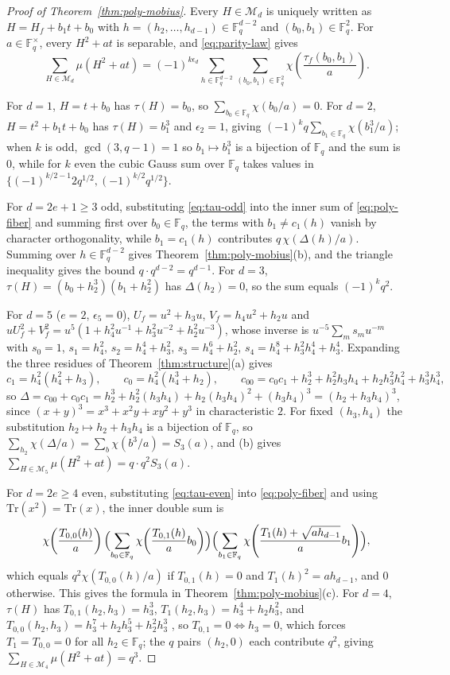 \documentclass[11pt,a4paper]{amsart}
\theoremstyle{remark}
\numberwithin{equation}{section}
\newcommand{\Fq}{\mathbb{F}_q}
\newcommand{\Tr}{\mathrm{Tr}}
\newcommand{\Me}{\mathcal{M}}
\begin{document}
\begin{proof}[Proof of Theorem~\ref{thm:poly-mobius}]
Every $H\in\Me_d$ is uniquely written as $H=H_f+b_1t+b_0$ with $h=(h_2,\dots,h_{d-1})\in\Fq^{d-2}$ and
$(b_0,b_1)\in\Fq^2$. For $a\in\Fq^\times$, every $H^2+at$ is separable, and \eqref{eq:parity-law} gives
\begin{equation}\label{eq:poly-fiber}
\sum_{H\in\Me_d}\mu(H^2+at)=(-1)^{k\epsilon_d}\sum_{h\in\Fq^{d-2}}\sum_{(b_0,b_1)\in\Fq^2}
\chi\!\left(\frac{\tau_f(b_0,b_1)}{a}\right).
\end{equation}

For $d=1$, $H=t+b_0$ has $\tau(H)=b_0$, so $\sum_{b_0\in\Fq}\chi(b_0/a)=0$. For $d=2$, $H=t^2+b_1t+b_0$ has
$\tau(H)=b_1^3$ and $\epsilon_2=1$, giving $(-1)^k q\sum_{b_1\in\Fq}\chi(b_1^3/a)$; when $k$ is odd, $\gcd(3,q-1)=1$ so
$b_1\mapsto b_1^3$ is a bijection of $\Fq$ and the sum is $0$, while for $k$ even the cubic Gauss sum over $\Fq$ takes
values in $\{(-1)^{k/2-1}2q^{1/2},(-1)^{k/2}q^{1/2}\}$.

For $d=2e+1\ge 3$ odd, substituting \eqref{eq:tau-odd} into the inner sum of \eqref{eq:poly-fiber} and summing first
over $b_0\in\Fq$, the terms with $b_1\ne c_1(h)$ vanish by character orthogonality, while $b_1=c_1(h)$ contributes
$q\,\chi(\Delta(h)/a)$. Summing over $h\in\Fq^{d-2}$ gives Theorem~\ref{thm:poly-mobius}(b), and the triangle
inequality gives the bound $q\cdot q^{d-2}=q^{d-1}$. For $d=3$, $\tau(H)=(b_0+h_2^3)(b_1+h_2^2)$ has $\Delta(h_2)=0$,
so the sum equals $(-1)^k q^2$.

For $d=5$ ($e=2$, $\epsilon_5=0$), $U_f=u^2+h_3u$, $V_f=h_4u^2+h_2u$ and $uU_f^2+V_f^2=u^5(1+h_4^2u^{-1}+h_3^2u^{-2}
+h_2^2u^{-3})$, whose inverse is $u^{-5}\sum_m s_mu^{-m}$ with $s_0=1$, $s_1=h_4^2$, $s_2=h_4^4+h_3^2$,
$s_3=h_4^6+h_2^2$, $s_4=h_4^8+h_3^2h_4^4+h_3^4$. Expanding the three residues of
Theorem~\ref{thm:structure}(a) gives
\[
c_1=h_4^2(h_4^2+h_3),\qquad c_0=h_4^2(h_4^3+h_2),\qquad c_{00}=c_0c_1+h_2^3+h_2^2h_3h_4+h_2h_3^2h_4^2+h_3^3h_4^3,
\]
so $\Delta=c_{00}+c_0c_1=h_2^3+h_2^2(h_3h_4)+h_2(h_3h_4)^2+(h_3h_4)^3=(h_2+h_3h_4)^3$, since
$(x+y)^3=x^3+x^2y+xy^2+y^3$ in characteristic $2$. For fixed $(h_3,h_4)$ the substitution $h_2\mapsto h_2+h_3h_4$
is a bijection of $\Fq$, so $\sum_{h_2}\chi(\Delta/a)=\sum_{b}\chi(b^3/a)=S_3(a)$, and (b) gives
$\sum_{H\in\Me_5}\mu(H^2+at)=q\cdot q^2S_3(a)$.

For $d=2e\ge 4$ even, substituting \eqref{eq:tau-even} into \eqref{eq:poly-fiber} and using $\Tr(x^2)=\Tr(x)$, the
inner double sum is
\[
\chi\!\left(\frac{T_{0,0}(h)}{a}\right)\Bigl(\sum_{b_0\in\Fq}\chi\!\left(\frac{T_{0,1}(h)}{a}b_0\right)\Bigr)
\Bigl(\sum_{b_1\in\Fq}\chi\!\left(\frac{T_1(h)+\sqrt{ah_{d-1}}}{a}b_1\right)\Bigr),
\]
which equals $q^2\chi(T_{0,0}(h)/a)$ if $T_{0,1}(h)=0$ and $T_1(h)^2=ah_{d-1}$, and $0$ otherwise. This gives the
formula in Theorem~\ref{thm:poly-mobius}(c). For $d=4$, $\tau(H)$ has $T_{0,1}(h_2,h_3)=h_3^3$, $T_1(h_2,h_3)=h_3^4+h_2h_3^2$,
and $T_{0,0}(h_2,h_3)=h_3^7+h_2h_3^5+h_2^2h_3^3$ \cite[\S2]{ChenShort}, so $T_{0,1}=0\iff h_3=0$, which forces
$T_1=T_{0,0}=0$ for all $h_2\in\Fq$; the $q$ pairs $(h_2,0)$ each contribute $q^2$, giving $\sum_{H\in\Me_4}\mu(H^2+at)=q^3$.


\end{proof}
\end{document}
